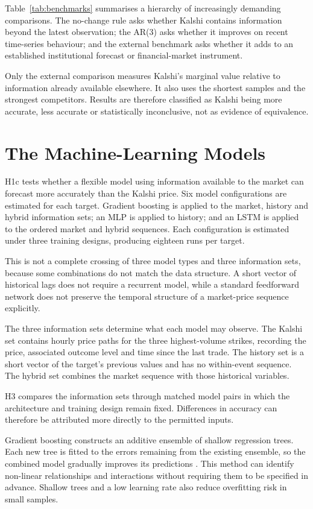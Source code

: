 \documentclass[12pt,a4paper]{report}
\begin{document}
Table~\ref{tab:benchmarks} summarises a hierarchy of increasingly demanding
comparisons. The no-change rule asks whether Kalshi contains information beyond
the latest observation; the AR(3) asks whether it improves on recent
time-series behaviour; and the external benchmark asks whether it adds to an
established institutional forecast or financial-market instrument.

Only the external comparison measures Kalshi's marginal value relative to
information already available elsewhere. It also uses the shortest samples and
the strongest competitors. Results are therefore classified as Kalshi being
more accurate, less accurate or statistically inconclusive, not as evidence of
equivalence.


\section{The Machine-Learning Models}
\label{sec:ml-models}

H1c tests whether a flexible model using information available to the market can
forecast more accurately than the Kalshi price. Six model configurations are
estimated for each target. Gradient boosting is applied to the market, history
and hybrid information sets; an MLP is applied to history; and an LSTM is
applied to the ordered market and hybrid sequences. Each configuration is
estimated under three training designs, producing eighteen runs per target.

This is not a complete crossing of three model types and three information
sets, because some combinations do not match the data structure. A short vector
of historical lags does not require a recurrent model, while a standard
feedforward network does not preserve the temporal structure of a market-price
sequence explicitly.

The three information sets determine what each model may observe. The Kalshi
set contains hourly price paths for the three highest-volume strikes, recording
the price, associated outcome level and time since the last trade. The history
set is a short vector of the target's previous values and has no within-event
sequence. The hybrid set combines the market sequence with those historical
variables.

H3 compares the information sets through matched model pairs in which the
architecture and training design remain fixed. Differences in accuracy can
therefore be attributed more directly to the permitted inputs.

Gradient boosting constructs an additive ensemble of shallow regression trees.
Each new tree is fitted to the errors remaining from the existing ensemble, so
the combined model gradually improves its predictions \parencite{friedman2001}.
This method can identify non-linear relationships and interactions without
requiring them to be specified in advance. Shallow trees and a low learning
rate also reduce overfitting risk in small samples.
\end{document}
